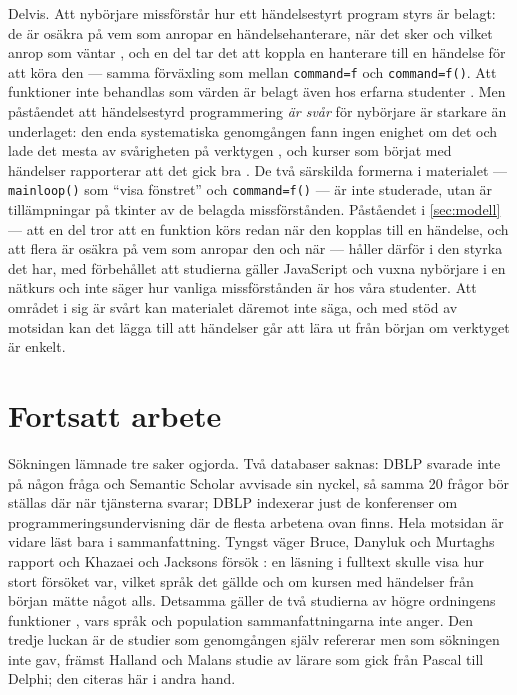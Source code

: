 Delvis.  Att nybörjare missförstår hur ett händelsestyrt program styrs
är belagt: de är osäkra på vem som anropar en händelsehanterare, när det
sker och vilket anrop som väntar
\autocite{Lukkarinen2021Listener,Lukkarinen2022Thesis}, och en del tar
det att koppla en hanterare till en händelse för att köra den
\autocite{Lehtinen2021Struggle} --- samma förväxling som mellan
\texttt{command=f} och \texttt{command=f()}.
Att funktioner inte behandlas som värden är belagt även hos erfarna
studenter \autocite{LuKrishnamurthi2024}.  Men påståendet att
händelsestyrd programmering \emph{är svår} för nybörjare är starkare än
underlaget: den enda systematiska genomgången fann ingen enighet om det
och lade det mesta av svårigheten på verktygen
\autocite{Lukkarinen2021Mapping}, och kurser som börjat med händelser
rapporterar att det gick bra
\autocite{BruceDanyluk2001,ChristensenCaspersen2002}.  De två
särskilda formerna i materialet --- \texttt{mainloop()} som
\enquote{visa fönstret} och \texttt{command=f()} --- är inte
studerade, utan är tillämpningar på tkinter av de belagda
missförstånden.  Påståendet i \cref{sec:modell} --- att en del tror att
en funktion körs redan när den kopplas till en händelse, och att flera
är osäkra på vem som anropar den och när --- håller därför i den
styrka det har, med förbehållet att studierna gäller JavaScript och
vuxna nybörjare i en nätkurs och inte säger hur vanliga missförstånden
är hos våra studenter.  Att området i sig är svårt kan materialet
däremot inte säga, och med stöd av motsidan kan det lägga till att
händelser går att lära ut från början om verktyget är enkelt.

\section{Fortsatt arbete}
\label{sec:handelser-fortsatt-grafik}

Sökningen lämnade tre saker ogjorda.  Två databaser saknas: DBLP
svarade inte på någon fråga och Semantic Scholar avvisade sin nyckel,
så samma 20 frågor bör ställas där när tjänsterna svarar; DBLP indexerar
just de konferenser om programmeringsundervisning där de flesta
arbetena ovan finns.  Hela motsidan är vidare läst bara i
sammanfattning.  Tyngst väger Bruce, Danyluk och Murtaghs rapport
\autocite{BruceDanyluk2001} och Khazaei och Jacksons försök
\autocite{KhazaeiJackson2002}: en läsning i fulltext skulle visa hur
stort försöket var, vilket språk det gällde och om kursen med händelser
från början mätte något alls.  Detsamma gäller de två studierna av
högre ordningens funktioner \autocite{KrishnamurthiFisler2021,
Rivera2022}, vars språk och population sammanfattningarna inte anger.
Den tredje luckan är de studier som genomgången själv refererar men
som sökningen inte gav, främst Halland och Malans studie av lärare som
gick från Pascal till Delphi; den citeras här i andra hand.

